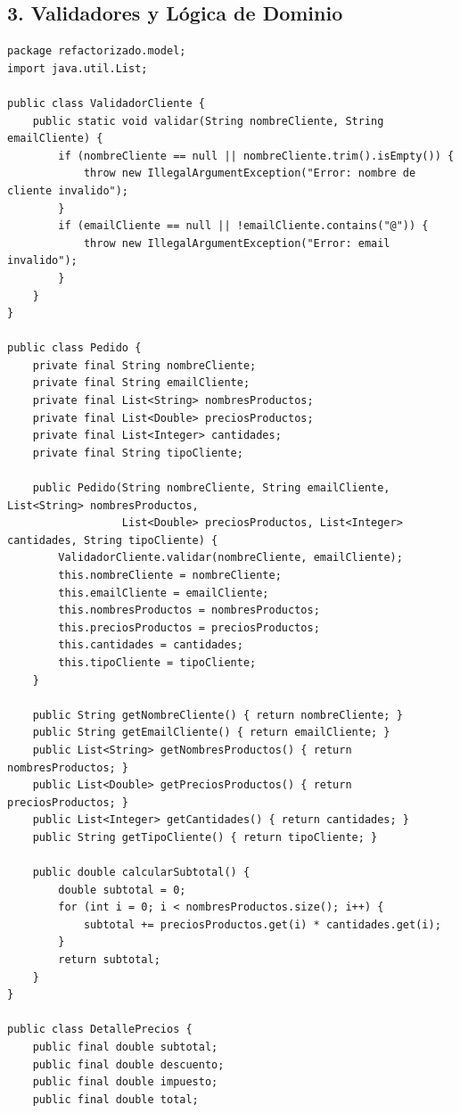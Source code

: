 \documentclass[12pt, a4paper]{article}
\begin{document}
\subsection{3. Validadores y Lógica de Dominio}
\begin{lstlisting}[caption={Clases de Dominio, Validación y Cálculo de Precios}, label={lst:dominio}]
package refactorizado.model;
import java.util.List;

public class ValidadorCliente {
    public static void validar(String nombreCliente, String emailCliente) {
        if (nombreCliente == null || nombreCliente.trim().isEmpty()) {
            throw new IllegalArgumentException("Error: nombre de cliente invalido");
        }
        if (emailCliente == null || !emailCliente.contains("@")) {
            throw new IllegalArgumentException("Error: email invalido");
        }
    }
}

public class Pedido {
    private final String nombreCliente;
    private final String emailCliente;
    private final List<String> nombresProductos;
    private final List<Double> preciosProductos;
    private final List<Integer> cantidades;
    private final String tipoCliente;

    public Pedido(String nombreCliente, String emailCliente, List<String> nombresProductos,
                  List<Double> preciosProductos, List<Integer> cantidades, String tipoCliente) {
        ValidadorCliente.validar(nombreCliente, emailCliente);
        this.nombreCliente = nombreCliente;
        this.emailCliente = emailCliente;
        this.nombresProductos = nombresProductos;
        this.preciosProductos = preciosProductos;
        this.cantidades = cantidades;
        this.tipoCliente = tipoCliente;
    }

    public String getNombreCliente() { return nombreCliente; }
    public String getEmailCliente() { return emailCliente; }
    public List<String> getNombresProductos() { return nombresProductos; }
    public List<Double> getPreciosProductos() { return preciosProductos; }
    public List<Integer> getCantidades() { return cantidades; }
    public String getTipoCliente() { return tipoCliente; }

    public double calcularSubtotal() {
        double subtotal = 0;
        for (int i = 0; i < nombresProductos.size(); i++) {
            subtotal += preciosProductos.get(i) * cantidades.get(i);
        }
        return subtotal;
    }
}

public class DetallePrecios {
    public final double subtotal;
    public final double descuento;
    public final double impuesto;
    public final double total;


\end{lstlisting}
\end{document}
